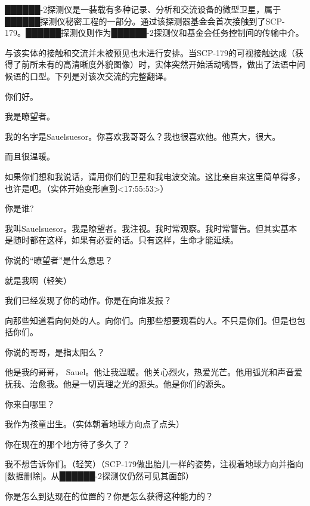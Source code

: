 ██████-2探测仪是一装载有多种记录、分析和交流设备的微型卫星，属于██████探测仪秘密工程的一部分。通过该探测器基金会首次接触到了SCP-179。██████探测仪则作为██████-2探测仪和基金会任务控制间的传输中介。

与该实体的接触和交流并未被预见也未进行安排。当SCP-179的可视接触达成（获得了前所未有的高清晰度外貌图像）时，实体突然开始活动嘴唇，做出了法语中问候语的口型。下列是对该次交流的完整翻译。

\begin{scpbox}

你们好。

我是瞭望者。

我的名字是Sauelsuesor。你喜欢我哥哥么？我也很喜欢他。他真大，很大。

而且很温暖。

如果你们想和我说话，请用你们的卫星和我电波交流。这比亲自来这里简单得多，也许是吧。（实体开始变形直到<17:55:53>）

你是谁?

我叫Sauelsuesor。我是瞭望者。我注视。我时常观察。我时常警告。但其实基本是随时都在这样，如果有必要的话。只有这样，生命才能延续。

你说的“瞭望者”是什么意思？

就是我啊（轻笑）

我们已经发现了你的动作。你是在向谁发报？

向那些知道看向何处的人。向你们。向那些想要观看的人。不只是你们。但是也包括你们。

你说的哥哥，是指太阳么？

他是我的哥哥， Sauel。他让我温暖。他关心烈火，热爱光芒。他用弧光和声音爱抚我、治愈我。他是一切真理之光的源头。他是你们的源头。

你来自哪里？

我作为孩童出生。（实体朝着地球方向点了点头）

你在现在的那个地方待了多久了？

我不想告诉你们。（轻笑）（SCP-179做出胎儿一样的姿势，注视着地球方向并指向{[}数据删除]。从██████-2探测仪仍然可见其面部）

你是怎么到达现在的位置的？你是怎么获得这种能力的？


\end{scpbox}
